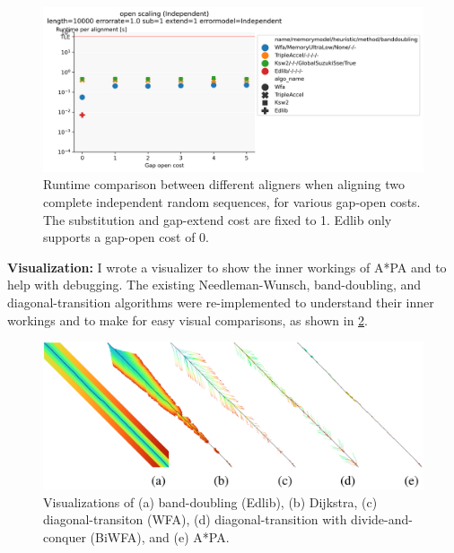 \documentclass[11pt,english,a4paper]{article}
\begin{document}
\begin{figure}[t]
\centering
\includegraphics[width=.9\linewidth]{./gap_open_scaling_Independent.png}
\caption{\label{gap_open_scaling}Runtime comparison between different aligners when aligning two complete independent random sequences, for various gap-open costs. The substitution and gap-extend cost are fixed to 1. Edlib only supports a gap-open cost of \(0\).}
\end{figure}

\textbf{Visualization:}
I wrote a visualizer to show the inner workings of A*PA and to help with
debugging. The existing Needleman-Wunsch, band-doubling, and diagonal-transition
algorithms were re-implemented to understand their inner workings and to make
for easy visual comparisons, as shown in \ref{vis}.

\begin{figure}[t]
\centering
\includegraphics[width=.9\linewidth]{./vis.png}
\caption{\label{vis}Visualizations of (a) band-doubling (Edlib), (b) Dijkstra, (c) diagonal-transiton (WFA), (d) diagonal-transition with divide-and-conquer (BiWFA), and (e) A*PA.}
\end{figure}
\end{document}
